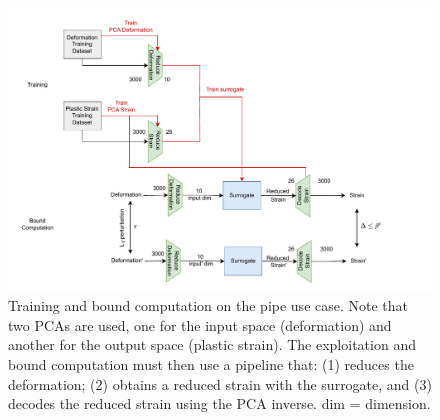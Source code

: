 \begin{figure}
    \centering
    \includegraphics[scale=0.9]{PIPE.pdf} \hspace{1.5cm}
    \caption{Training and bound computation on the pipe use case. Note that two PCAs are used, one for the input space (deformation) and another for the output space (plastic strain). The exploitation and bound computation must then use a pipeline that: (1) reduces the deformation; (2) obtains a reduced strain with the surrogate, and (3) decodes the reduced strain using the PCA inverse. dim = dimension.}
    \label{fig.PIPE}
\end{figure}	
